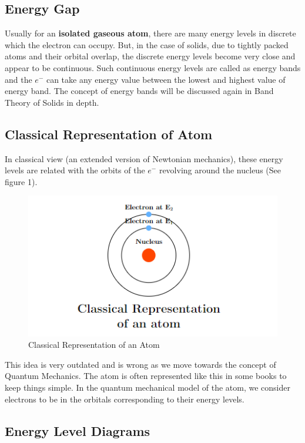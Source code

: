 \documentclass[12pt]{article}
\begin{document}
\subsection{Energy Gap}

Usually for an \textbf{isolated gaseous atom}, there are many energy levels in discrete which the electron can occupy. But, in the case of solids, due to tightly packed atoms and their orbital overlap, the discrete energy levels become very close and appear to be continuous. Such continuous energy levels are called as energy bands and the $e^{-}$ can take any energy value between the lowest and highest value of energy band. The concept of energy bands will be discussed again in Band Theory of Solids in depth.

\subsection{Classical Representation of Atom}

In classical view (an extended version of Newtonian mechanics), these energy levels are related with the orbits of the $e^{-}$ revolving around the nucleus (See figure 1).

\begin{figure}[H]
    \centering
    \includegraphics[scale=0.8]{./img/01_classical_atom.png}
    \caption{Classical Representation of an Atom}
\end{figure}

This idea is very outdated and is wrong as we move towards the concept of Quantum Mechanics. The atom is often represented like this in some books to keep things simple. In the quantum mechanical model of the atom, we consider electrons to be in the orbitals corresponding to their energy levels.

\subsection{Energy Level Diagrams}
\end{document}
